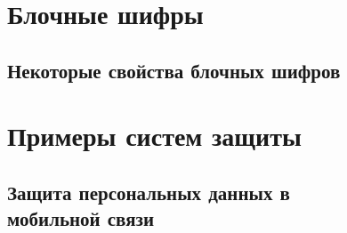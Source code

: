 \documentclass[10pt,a4paper,openany]{book}
\begin{document}






\chapter{Блочные шифры}\label{chapter-block-ciphers}















\section{Некоторые свойства блочных шифров}






















\chapter{Примеры систем защиты}









\section[Защита персональных данных в мобильной связи]{Защита персональных данных в \protect\\ мобильной связи}
\end{document}

